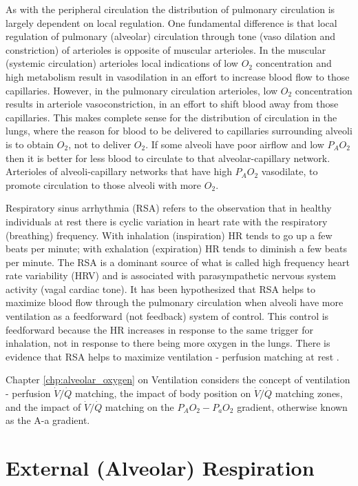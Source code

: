 As with the peripheral circulation the distribution of pulmonary circulation is largely dependent on local regulation. One fundamental difference is that local regulation of pulmonary (alveolar) circulation through tone (vaso dilation and constriction) of arterioles is opposite of muscular arterioles. In the muscular (systemic circulation) arterioles local indications of low $O_2$ concentration and high metabolism result in vasodilation in an effort to increase blood flow to those capillaries. However, in the pulmonary circulation arterioles, low $O_2$ concentration results in arteriole vasoconstriction, in an effort to shift blood away from those capillaries. This makes complete sense for the distribution of circulation in the lungs, where the reason for blood to be delivered to capillaries surrounding alveoli is to obtain $O_2$, not to deliver $O_2$. If some alveoli have poor airflow and low $P_AO_2$ then it is better for less blood to circulate to that alveolar-capillary network. Arterioles of alveoli-capillary networks that have high $P_AO_2$ vasodilate, to promote circulation to those alveoli with more $O_2$.

Respiratory sinus arrhythmia (RSA) refers to the observation that in healthy individuals at rest there is cyclic variation in heart rate with the respiratory (breathing) frequency. With inhalation (inspiration) HR tends to go up a few beats per minute; with exhalation (expiration) HR tends to diminish a few beats per minute. The RSA is a dominant source of what is called high frequency heart rate variability (HRV) and is associated with parasympathetic nervous system activity (vagal cardiac tone). It has been hypothesized that RSA helps to maximize blood flow through the pulmonary circulation when alveoli have more ventilation as a feedforward (not feedback) system of control. This control is feedforward because the HR increases in response to the same trigger for inhalation, not in response to there being more oxygen in the lungs. There is evidence that RSA helps to maximize ventilation - perfusion matching at rest \cite{hayano_hypothesis_2003}.

Chapter \ref{chp:alveolar_oxygen} on Ventilation considers the concept of ventilation - perfusion $\dot{V}/\dot{Q}$ matching, the impact of body position on $\dot{V}/\dot{Q}$ matching zones, and the impact of $\dot{V}/\dot{Q}$ matching on the $P_AO_2-P_aO_2$ gradient, otherwise known as the A-a gradient.

\section{External (Alveolar) Respiration}

